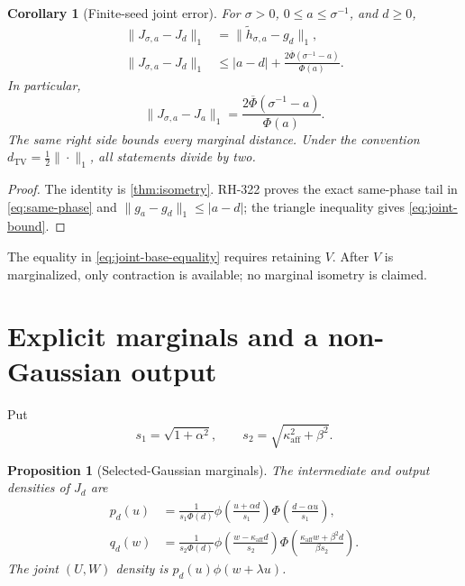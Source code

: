 \documentclass[11pt]{article}
\newtheorem{corollary}[theorem]{Corollary}
\newtheorem{proposition}[theorem]{Proposition}
\theoremstyle{remark}
\newcommand{\ka}{\kappa_{\mathrm{aff}}}
\newcommand{\TV}{\mathrm{TV}}
\begin{document}
\begin{corollary}[Finite-seed joint error]\label{cor:finite-seed}
For $\sigma>0$, $0\le a\le\sigma^{-1}$, and $d\ge0$,
\begin{align}
 \|J_{\sigma,a}-J_d\|_1
 &=\|\widetilde h_{\sigma,a}-g_d\|_1,
 \label{eq:joint-base-equality}\\
 \|J_{\sigma,a}-J_d\|_1
 &\le |a-d|+
 \frac{2\overline\Phi(\sigma^{-1}-a)}{\Phi(a)}.
 \label{eq:joint-bound}
\end{align}
In particular,
\begin{equation}\label{eq:same-phase}
 \|J_{\sigma,a}-J_a\|_1
 =\frac{2\overline\Phi(\sigma^{-1}-a)}{\Phi(a)}.
\end{equation}
The same right side bounds every marginal distance.  Under the convention
$d_{\TV}=\tfrac12\|\cdot\|_1$, all statements divide by two.
\end{corollary}

\begin{proof}
The identity is \cref{thm:isometry}.  RH-322 proves the exact same-phase
tail in \eqref{eq:same-phase} and
$\|g_a-g_d\|_1\le|a-d|$; the triangle inequality gives
\eqref{eq:joint-bound}.
\end{proof}

The equality in \eqref{eq:joint-base-equality} requires retaining $V$.
After $V$ is marginalized, only contraction is available; no marginal
isometry is claimed.

\section{Explicit marginals and a non-Gaussian output}

Put
\begin{equation}\label{eq:scales}
 s_1=\sqrt{1+\alpha^2},
 \qquad s_2=\sqrt{\ka^2+\beta^2}.
\end{equation}

\begin{proposition}[Selected-Gaussian marginals]\label{prop:marginals}
The intermediate and output densities of $J_d$ are
\begin{align}
 p_d(u)
 &=\frac1{s_1\Phi(d)}
 \phi\!\left(\frac{u+\alpha d}{s_1}\right)
 \Phi\!\left(\frac{d-\alpha u}{s_1}\right),
 \label{eq:intermediate-density}\\
 q_d(w)
 &=\frac1{s_2\Phi(d)}
 \phi\!\left(\frac{w-\ka d}{s_2}\right)
 \Phi\!\left(
 \frac{\ka w+\beta^2d}{\beta s_2}
 \right).
 \label{eq:output-density}
\end{align}
The joint $(U,W)$ density is $p_d(u)\phi(w+\lambda u)$.
\end{proposition}
\end{document}
